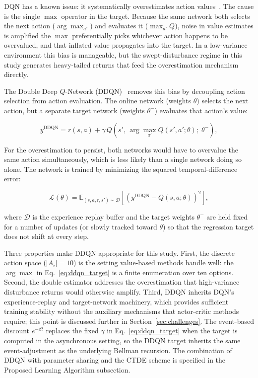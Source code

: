 DQN has a known issue: it systematically overestimates action values~\cite{vanHasselt2016DDQN}. The cause is the single $\max$ operator in the target. Because the same network both selects the next action ($\arg\max_{a'}$) and evaluates it ($\max_{a'} Q$), noise in value estimates is amplified the $\max$ preferentially picks whichever action happens to be overvalued, and that inflated value propagates into the target. In a low-variance environment this bias is manageable, but the swept-disturbance regime in this study generates heavy-tailed returns that feed the overestimation mechanism directly.

The Double Deep $Q$-Network (DDQN)~\cite{vanHasselt2016DDQN} removes this bias by decoupling action selection from action evaluation. The online network (weights $\theta$) selects the next action, but a separate target network (weights $\theta^-$) evaluates that action's value:

\begin{equation}
y^{\text{DDQN}} = r(s,a) + \gamma\, Q\!\left(s',\, \arg\max_{a'} Q(s', a'; \theta);\; \theta^-\right),
\label{eq:ddqn_target}
\end{equation}

For the overestimation to persist, both networks would have to overvalue the same action simultaneously, which is less likely than a single network doing so alone. The network is trained by minimizing the squared temporal-difference error:

\begin{equation}
\mathcal{L}(\theta) = \mathbb{E}_{(s,a,r,s') \sim \mathcal{D}} \left[ \left( y^{\text{DDQN}} - Q(s,a;\theta) \right)^2 \right],
\label{eq:ddqn_loss}
\end{equation}

where $\mathcal{D}$ is the experience replay buffer and the target weights $\theta^-$ are held fixed for a number of updates (or slowly tracked toward $\theta$) so that the regression target does not shift at every step.

Three properties make DDQN appropriate for this study. First, the discrete action space ($|A_i| = 10$) is the setting value-based methods handle well: the $\arg\max$ in Eq.~\eqref{eq:ddqn_target} is a finite enumeration over ten options. Second, the double estimator addresses the overestimation that high-variance disturbance returns would otherwise amplify. Third, DDQN inherits DQN's experience-replay and target-network machinery, which provides sufficient training stability without the auxiliary mechanisms that actor-critic methods require; this point is discussed further in Section~\ref{sec:challenges}. The event-based discount $e^{-\beta t}$ replaces the fixed $\gamma$ in Eq.~\eqref{eq:ddqn_target} when the target is computed in the asynchronous setting, so the DDQN target inherits the same event-adjustment as the underlying Bellman recursion. The combination of DDQN with parameter sharing and the CTDE scheme is specified in the Proposed Learning Algorithm subsection.

